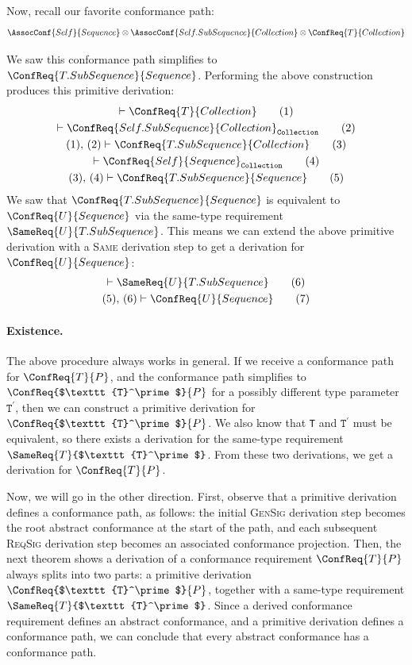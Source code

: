 \documentclass[../generics]{subfiles}
\begin{document}
Now, recall our favorite conformance path:
\[\AssocConf{Self}{Sequence} \otimes \AssocConf{Self.SubSequence}{Collection} \otimes \ConfReq{T}{Collection}\]

We saw this conformance path simplifies to $\ConfReq{T.SubSequence}{Sequence}$. Performing the above construction produces this primitive derivation:
\begin{gather*}
\vdash\ConfReq{T}{Collection}\tag{1}\\
\vdash\ConfReq{Self.SubSequence}{Collection}_\texttt{Collection}\tag{2}\\
(1),\,(2)\vdash\ConfReq{T.SubSequence}{Collection}\tag{3}\\
\vdash\ConfReq{Self}{Sequence}_\texttt{Collection}\tag{4}\\
(3),\,(4)\vdash\ConfReq{T.SubSequence}{Sequence}\tag{5}
\end{gather*}
We saw that $\ConfReq{T.SubSequence}{Sequence}$ is equivalent to $\ConfReq{U}{Sequence}$ via the same-type requirement $\SameReq{U}{T.SubSequence}$. This means we can extend the above primitive derivation with a \textsc{Same} derivation step to get a derivation for $\ConfReq{U}{Sequence}$:
\begin{gather*}
\vdash\SameReq{U}{T.SubSequence}\tag{6}\\
(5),\,(6)\vdash\ConfReq{U}{Sequence}\tag{7}
\end{gather*}

\paragraph{Existence.} The above procedure always works in general. If we receive a conformance path for $\ConfReq{T}{P}$, and the conformance path simplifies to $\ConfReq{$\texttt{T}^\prime$}{P}$ for a possibly different type parameter $\texttt{T}^\prime$,
then we can construct a primitive derivation for $\ConfReq{$\texttt{T}^\prime$}{P}$. We also know that \texttt{T} and $\texttt{T}^\prime$ must be equivalent, so there exists a derivation for the same-type requirement $\SameReq{T}{$\texttt{T}^\prime$}$. From these two derivations, we get a derivation for $\ConfReq{T}{P}$.

Now, we will go in the other direction. First, observe that a primitive derivation defines a conformance path, as follows: the initial \textsc{GenSig} derivation step becomes the root abstract conformance at the start of the path, and each subsequent \textsc{ReqSig} derivation step becomes an associated conformance projection. Then, the next theorem shows a derivation of a conformance requirement $\ConfReq{T}{P}$ always splits into two parts: a primitive derivation $\ConfReq{$\texttt{T}^\prime$}{P}$, together with a same-type requirement $\SameReq{T}{$\texttt{T}^\prime$}$. Since a derived conformance requirement defines an abstract conformance, and a primitive derivation defines a conformance path, we can conclude that every abstract conformance has a conformance path. 
\end{document}

